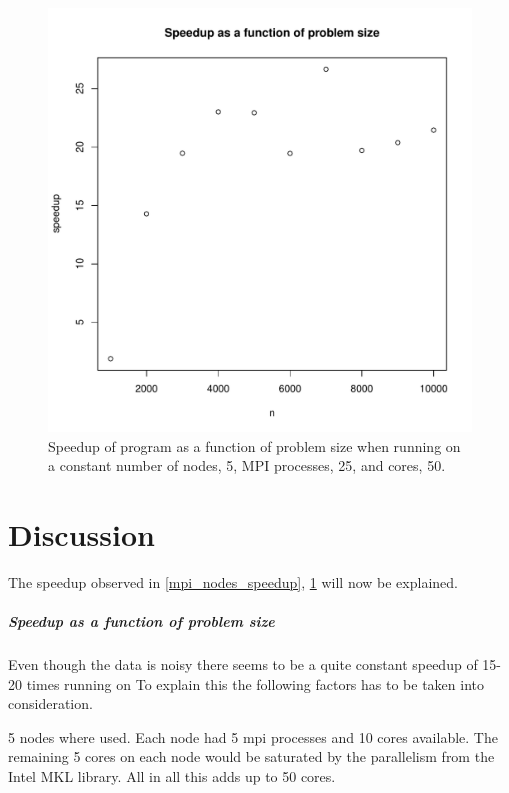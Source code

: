 \documentclass{article}
\begin{document}
\begin{figure}[H]
  \begin{center}
    \includegraphics[width=12cm]{../analysis/problem_size_speedup.pdf}
  \end{center}
  \caption{Speedup of program as a function of problem size when running on a constant number of nodes, 5, MPI processes, 25, and cores, 50.}
  \label{problem_size_speedup}
\end{figure}

\section{Discussion}
The speedup observed in \ref{mpi_nodes_speedup}, \ref{problem_size_speedup}
will now be explained.
\subparagraph{Speedup as a function of problem size}
Even though the data is noisy there seems to be a quite constant
speedup of 15-20 times running on 
To explain this the following factors has to be taken into consideration.

5 nodes where used. Each node had
5 mpi processes and 10 cores available. The remaining 5 cores on each
node would be saturated by the parallelism from the Intel MKL library.
All in all this adds up to 50 cores.

\end{document}
